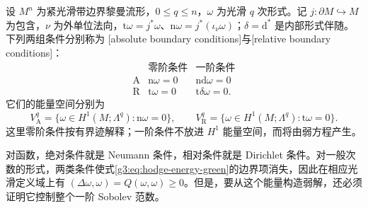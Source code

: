 \begin{definition}\label{g3:def:absolute-relative-boundary}
	设 \(M^n\) 为紧光滑带边界黎曼流形，\(0\le q\le n\)，\(\omega\) 为光滑 \(q\) 次形式。记 \(j:\partial M\hookrightarrow M\) 为包含，\(\nu\) 为外单位法向，\(\mathrm t\omega=j^*\omega\)、\(\mathrm n\omega=j^*(\iota_\nu\omega)\)；\(\delta=\mathrm d^*\) 是内部形式伴随。下列两组条件分别称为 [absolute boundary conditions]与[relative boundary conditions]：
	\begin{equation}\label{g3:eq:absolute-relative-boundary}
		\begin{array}{c|cc}
		 &\text{零阶条件}&\text{一阶条件}\\ \hline
		\mathrm A&\mathrm n\omega=0&\mathrm n\mathrm d\omega=0\\
		\mathrm R&\mathrm t\omega=0&\mathrm t\delta\omega=0.
		\end{array}
	\end{equation}
	它们的能量空间分别为
	\[
		V_{\mathrm A}^q=\{\omega\in H^1(M;\Lambda^q):\mathrm n\omega=0\},\qquad
		V_{\mathrm R}^q=\{\omega\in H^1(M;\Lambda^q):\mathrm t\omega=0\}.
	\]
	这里零阶条件按有界迹解释；一阶条件不放进 \(H^1\) 能量空间，而将由弱方程产生。
\end{definition}

对函数，绝对条件就是 Neumann 条件，相对条件就是 Dirichlet 条件。对一般次数的形式，两类条件使式\eqref{g3:eq:hodge-energy-green}的边界项消失，因此在相应光滑定义域上有 \((\Delta\omega,\omega)=Q(\omega,\omega)\ge0\)。但是，要从这个能量构造弱解，还必须证明它控制整个一阶 Sobolev 范数。

